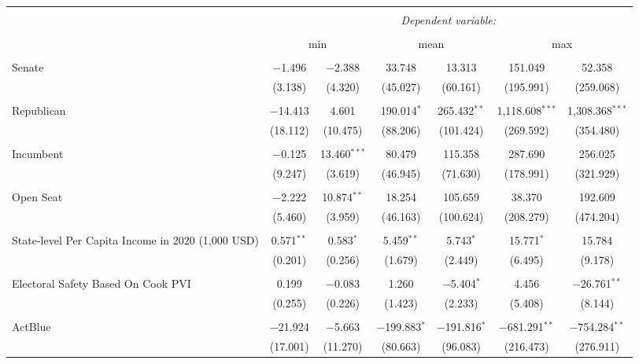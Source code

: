 
\begin{tabular}{@{\extracolsep{5pt}}lcccccc} 
\\[-1.8ex]\hline 
\hline \\[-1.8ex] 
 & \multicolumn{6}{c}{\textit{Dependent variable:}} \\ 
\cline{2-7} 
\\[-1.8ex] & \multicolumn{2}{c}{min} & \multicolumn{2}{c}{mean} & \multicolumn{2}{c}{max} \\ 
\hline \\[-1.8ex] 
 Senate & $-$1.496 & $-$2.388 & 33.748 & 13.313 & 151.049 & 52.358 \\ 
  & (3.138) & (4.320) & (45.027) & (60.161) & (195.991) & (259.068) \\ 
  & & & & & & \\ 
 Republican & $-$14.413 & 4.601 & 190.014$^{*}$ & 265.432$^{**}$ & 1,118.608$^{***}$ & 1,308.368$^{***}$ \\ 
  & (18.112) & (10.475) & (88.206) & (101.424) & (269.592) & (354.480) \\ 
  & & & & & & \\ 
 Incumbent & $-$0.125 & 13.460$^{***}$ & 80.479 & 115.358 & 287.690 & 256.025 \\ 
  & (9.247) & (3.619) & (46.945) & (71.630) & (178.991) & (321.929) \\ 
  & & & & & & \\ 
 Open Seat & $-$2.222 & 10.874$^{**}$ & 18.254 & 105.659 & 38.370 & 192.609 \\ 
  & (5.460) & (3.959) & (46.163) & (100.624) & (208.279) & (474.204) \\ 
  & & & & & & \\ 
 State-level Per Capita Income in 2020 (1,000 USD) & 0.571$^{**}$ & 0.583$^{*}$ & 5.459$^{**}$ & 5.743$^{*}$ & 15.771$^{*}$ & 15.784 \\ 
  & (0.201) & (0.256) & (1.679) & (2.449) & (6.495) & (9.178) \\ 
  & & & & & & \\ 
 Electoral Safety Based On Cook PVI & 0.199 & $-$0.083 & 1.260 & $-$5.404$^{*}$ & 4.456 & $-$26.761$^{**}$ \\ 
  & (0.255) & (0.226) & (1.423) & (2.233) & (5.408) & (8.144) \\ 
  & & & & & & \\ 
 ActBlue & $-$21.924 & $-$5.663 & $-$199.883$^{*}$ & $-$191.816$^{*}$ & $-$681.291$^{**}$ & $-$754.284$^{**}$ \\ 
  & (17.001) & (11.270) & (80.663) & (96.083) & (216.473) & (276.911) \\ 

\end{tabular}
